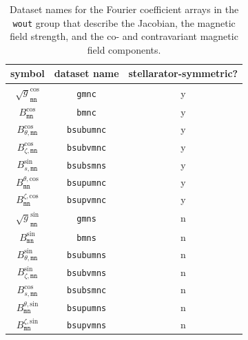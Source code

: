 \begin{table}[h]
 \centering
 \begin{tabular}{|c|c|c|}
  \hline
  symbol & dataset name & stellarator-symmetric? \\
  \hline
  $\sqrt{g}_\texttt{mn}^\mathrm{cos}$   & \texttt{gmnc}     & y \\
  $B_\texttt{mn}^\mathrm{cos}$          & \texttt{bmnc}     & y \\
  $B_{\theta,\texttt{mn}}^\mathrm{cos}$ & \texttt{bsubumnc} & y \\
  $B_{\zeta,\texttt{mn}}^\mathrm{cos}$  & \texttt{bsubvmnc} & y \\
  $B_{s,\texttt{mn}}^\mathrm{sin}$      & \texttt{bsubsmns} & y \\
  $B_\texttt{mn}^{\theta,\mathrm{cos}}$ & \texttt{bsupumnc} & y \\
  $B_\texttt{mn}^{\zeta,\mathrm{cos}}$  & \texttt{bsupvmnc} & y \\
  \hline
  $\sqrt{g}_\texttt{mn}^\mathrm{sin}$   & \texttt{gmns}     & n \\
  $B_\texttt{mn}^\mathrm{sin}$          & \texttt{bmns}     & n \\
  $B_{\theta,\texttt{mn}}^\mathrm{sin}$ & \texttt{bsubumns} & n \\
  $B_{\zeta,\texttt{mn}}^\mathrm{sin}$  & \texttt{bsubvmns} & n \\
  $B_{s,\texttt{mn}}^\mathrm{cos}$      & \texttt{bsubsmnc} & n \\
  $B_\texttt{mn}^{\theta,\mathrm{sin}}$ & \texttt{bsupumns} & n \\
  $B_\texttt{mn}^{\zeta,\mathrm{sin}}$  & \texttt{bsupvmns} & n \\
  \hline
 \end{tabular}
 \caption{Dataset names for the Fourier coefficient arrays in the \texttt{wout} group
          that describe the Jacobian, the magnetic field strength,
          and the co- and contravariant magnetic field components.}
 \label{tab:fc_gb}
\end{table}


